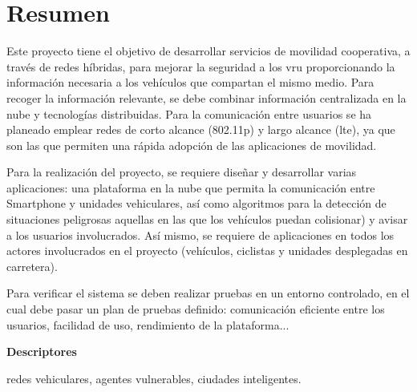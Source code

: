 \chapter*{Resumen}
Este proyecto tiene el objetivo de desarrollar servicios de movilidad cooperativa, a través de
redes híbridas, para mejorar la seguridad a los \gls{vru} proporcionando la información necesaria
a los vehículos que compartan el mismo medio. Para recoger la información relevante, se debe combinar
información centralizada en la nube y tecnologías distribuidas. Para la comunicación entre usuarios se
ha planeado emplear redes de corto alcance (\Gls{802.11p}) y largo alcance (\gls{lte}),
ya que son las que permiten una rápida adopción de las aplicaciones de movilidad.

Para la realización del proyecto, se requiere diseñar y desarrollar varias aplicaciones: una plataforma
en la nube que permita la comunicación entre Smartphone y unidades vehiculares, así como algoritmos para
la detección de situaciones peligrosas aquellas en las que los vehículos puedan colisionar) y avisar a
los usuarios involucrados. Así mismo, se requiere de aplicaciones en todos los actores involucrados en
el proyecto (vehículos, ciclistas y unidades desplegadas en carretera).

Para verificar el sistema se deben realizar pruebas en un entorno controlado, en el cual debe pasar un
plan de pruebas definido: comunicación eficiente entre los usuarios, facilidad de uso, rendimiento de
la plataforma...

\vspace{2em}

{\Large\bfseries\sectionfont Descriptores}
\vspace{3\medskipamount}

redes vehiculares, agentes vulnerables, ciudades inteligentes.

\cleardoublepage\tableofcontents
\cleardoublepage\listoffigures
\cleardoublepage\listoftables
\cleardoublepage\listoflistings

\mainmatter
\pagestyle{phdthesis}
